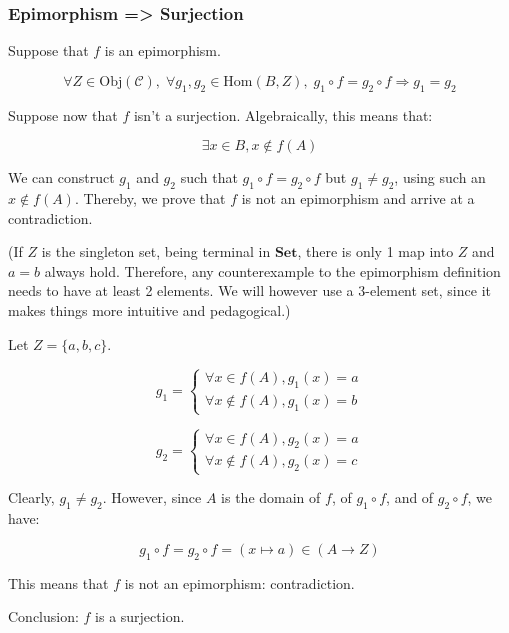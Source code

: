 \subsubsection*{Epimorphism => Surjection}

Suppose that $f$ is an epimorphism.

$$
\forall Z \in \text{Obj}(\mathcal{C}), \;
\forall g_1, g_2 \in \text{Hom}(B, Z), \;
g_1 \circ f = g_2 \circ f \Rightarrow g_1 = g_2
$$

Suppose now that $f$ isn't a surjection. Algebraically, this means that:

$$\exists x \in B, x \notin f(A)$$

We can construct $g_1$ and $g_2$ such that $g_1 \circ f = g_2 \circ f$ but $g_1 \neq g_2$, using such an $x \notin f(A)$. Thereby, we prove that $f$ is not an epimorphism and arrive at a contradiction.

(If $Z$ is the singleton set, being terminal in $\mathbf{Set}$, there is only 1 map into $Z$ and $a = b$ always hold. Therefore, any counterexample to the epimorphism definition needs to have at least 2 elements. We will however use a 3-element set, since it makes things more intuitive and pedagogical.)

Let $Z = \{a, b, c\}$.

$$
g_1 =
\begin{cases}
	\forall x    \in f(A), g_1(x) = a \\
	\forall x \notin f(A), g_1(x) = b
\end{cases}
$$

$$
g_2 =
\begin{cases}
	\forall x    \in f(A), g_2(x) = a \\
	\forall x \notin f(A), g_2(x) = c
\end{cases}
$$

Clearly, $g_1 \neq g_2$. However, since $A$ is the domain of $f$, of $g_1 \circ f$, and of $g_2 \circ f$, we have:

$$
g_1 \circ f = g_2 \circ f = (x \mapsto a) \in (A \to Z)
$$

This means that $f$ is not an epimorphism: contradiction.

Conclusion: $f$ is a surjection.
